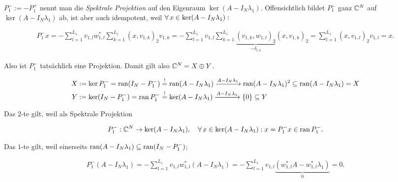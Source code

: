 \begin{remark} \label{spektrale_projektion}
    
    $P_1^- := -P_1^+$ nennt man die \textit{Spektrale Projektion} auf den Eigenraum $\ker (A - I_N \lambda_1)$.
    Offensichtlich bildet $P_1^-$ ganz $\mathbb{C}^N$ auf $\ker (A - I_N \lambda_1)$ ab, ist aber auch idempotent, weil $\forall \, x \in \ker (A - I_N \lambda_1):$

    \begin{align*}
        P_1^- x
        =
        -\sum_{l=1}^{L_1}
            v_{1, l}
            w_{1, l}^\ast
            \sum_{k=1}^{L_1}
                (x, v_{1, k})_2
                v_{1, k}
        =
        -\sum_{l=1}^{L_1}
            v_{1, l}
            \sum_{k=1}^{L_1}
                \underbrace{(v_{1, k}, w_{1, l})_2}_{-\delta_{l, k}}
                (x, v_{1, k})_2
        =
        \sum_{l=1}^{L_1}
            (x, v_{1, l})_2
            v_{1, l}
        =
        x.
    \end{align*}

    Also ist $P_1^-$ tatsächlich eine Projektion.
    Damit gilt also $ \mathbb{C}^N = X \oplus Y$.

    \begin{align*}
        X & := \ker P_1^- = \operatorname{ran} (I_N - P_1^-) \stackrel{!}{=} \operatorname{ran} (A - I_N \lambda_1) \xrightarrow{A - I_N \lambda_1} \operatorname{ran} (A - I_N \lambda_1)^2 \subseteq \operatorname{ran} (A - I_N \lambda_1) = X \\
        Y & := \ker (I_N - P_1^-) = \operatorname{ran} P_1^- \stackrel{!}{=} \ker (A - I_N \lambda_1) \xrightarrow{A - I_N \lambda_1} {\left \{ 0 \right \}} \subseteq Y
    \end{align*}

    Das $2$-te \Quote{!} gilt, weil als Spektrale Projektion

    \begin{align*}
        P_1^-: \mathbb{C}^N \to \ker (A - I_N \lambda_1),
        \quad
        \forall \, x \in \ker (A - I_N \lambda_1):
            x = P_1^- x \in \operatorname{ran} P_1^-.
    \end{align*}

    Das $1$-te \Quote{!} gilt, weil einerseits $\operatorname{ran} (A - I_N \lambda_1) \subseteq \operatorname{ran} (I_N - P_1^-)$;

    \begin{align*}
        P_1^- (A - I_N \lambda_1)
        =
        -\sum_{l=1}^{L_1}
            v_{1, l} w_{1, l}^\ast
        (A - I_N \lambda_1)
        =
        -\sum_{l=1}^{L_1}
            v_{1, l}
            \underbrace
            {
                (w_{1, l}^\ast A
                -
                w_{1, l}^\ast \lambda_1)
            }_0
        =
        0.
    \end{align*}


\end{remark}
